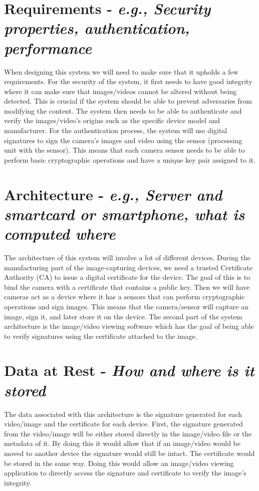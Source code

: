 \documentclass[9pt]{extarticle}
\begin{document}
\section{Requirements - \textit{e.g., Security properties, authentication, performance}}
When designing this system we will need to make sure that it upholds a few requirements. For the security of the system, it first needs to have good integrity where it can make sure that images/videos cannot be altered without being detected. This is crucial if the system should be able to prevent adversaries from modifying the content. The system then needs to be able to authenticate and verify the images/video's origins such as the specific device model and manufacturer. For the authentication process, the system will use digital signatures to sign the camera's images and video using the sensor (processing unit with the sensor). This means that each camera sensor needs to be able to perform basic cryptographic operations and have a unique key pair assigned to it.

\section{Architecture - \textit{e.g., Server and smartcard or smartphone, what is computed where}}
The architecture of this system will involve a lot of different devices. During the manufacturing part of the image-capturing devices, we need a trusted Certificate Authority (CA) \cite{WhatisaC45:online} to issue a digital certificate for the device. The goal of this is to bind the camera with a certificate that contains a public key. Then we will have cameras act as a device where it has a sensors that can perform cryptographic operations and sign images. This means that the camera/sensor will capture an image, sign it, and later store it on the device. The second part of the system architecture is the image/video viewing software which has the goal of being able to verify signatures using the certificate attached to the image.

\section{Data at Rest - \textit{How and where is it stored}}
The data associated with this architecture is the signature generated for each video/image and the certificate for each device. First, the signature generated from the video/image will be either stored directly in the image/video file or the metadata of it. By doing this it would allow that if an image/video would be moved to another device the signature would still be intact. The certificate would be stored in the same way. Doing this would allow an image/video viewing application to directly access the signature and certificate to verify the image's integrity.
\end{document}
